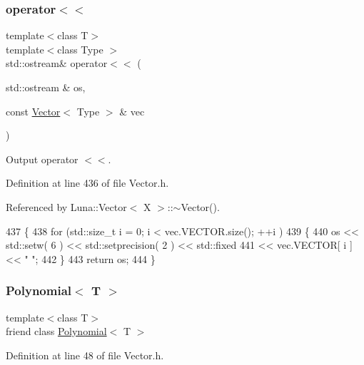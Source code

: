 \subsubsection{\texorpdfstring{operator$<$$<$}{operator<<}}
{\footnotesize\ttfamily template$<$class T$>$ \\
template$<$class Type $>$ \\
std\+::ostream\& operator$<$$<$ (\begin{DoxyParamCaption}\item[{std\+::ostream \&}]{os,  }\item[{const \hyperlink{classLuna_1_1Vector}{Vector}$<$ Type $>$ \&}]{vec }\end{DoxyParamCaption})\hspace{0.3cm}{\ttfamily [friend]}}



Output operator $<$$<$. 



Definition at line 436 of file Vector.\+h.



Referenced by Luna\+::\+Vector$<$ X $>$\+::$\sim$\+Vector().


\begin{DoxyCode}
437   \{
438     \textcolor{keywordflow}{for} (std::size\_t i = 0; i < vec.VECTOR.size(); ++i )
439     \{
440       os << std::setw( 6 ) << std::setprecision( 2 ) << std::fixed
441          << vec.VECTOR[ i ] << \textcolor{stringliteral}{" "};
442     \}
443     \textcolor{keywordflow}{return} os;
444   \}
\end{DoxyCode}
\mbox{\label{classLuna_1_1Vector_abe8021c8bfcc7f40c69097469d597830}} 
\subsubsection{\texorpdfstring{Polynomial$<$ T $>$}{Polynomial< T >}}
{\footnotesize\ttfamily template$<$class T$>$ \\
friend class \hyperlink{classLuna_1_1Polynomial}{Polynomial}$<$ T $>$\hspace{0.3cm}{\ttfamily [friend]}}



Definition at line 48 of file Vector.\+h.

\mbox{\label{classLuna_1_1Vector_a25dda511be44f42c60e3c7117aac3f2a}} 
